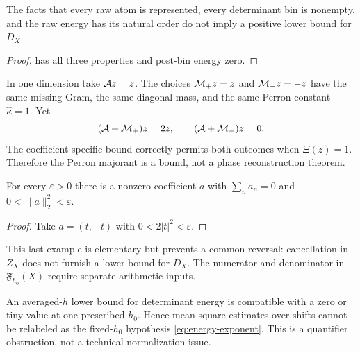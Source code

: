 \begin{corollary}
\label{cor:support-not-energy}
The facts that every raw atom is represented, every determinant bin
is nonempty, and the raw energy has its natural order do not imply a
positive lower bound for \(D_X\).
\end{corollary}

\begin{proof}
 has all three properties and
post-bin energy zero.
\end{proof}

\begin{example}
\label{ex:same-majorant}
In one dimension take \(\mathcal A z=z\).  The choices
\(\mathcal M_+z=z\) and \(\mathcal M_-z=-z\) have the same missing Gram,
the same diagonal mass, and the same Perron constant
\(\widehat\kappa=1\).  Yet
\[
 (\mathcal A+\mathcal M_+)z=2z,
 \qquad
 (\mathcal A+\mathcal M_-)z=0.
\]
The coefficient-specific bound correctly permits both outcomes when
\(\Xi(z)=1\).  Therefore the Perron majorant is a bound, not a phase
reconstruction theorem.
\end{example}

\begin{proposition}
\label{prop:zero-not-energy}
For every \(\varepsilon>0\) there is a nonzero coefficient \(a\) with
\(\sum_na_n=0\) and \(0<\|a\|_2^2<\varepsilon\).
\end{proposition}

\begin{proof}
Take \(a=(t,-t)\) with
\(0<2|t|^2<\varepsilon\).
\end{proof}

This last example is elementary but prevents a common reversal:
cancellation in \(Z_X\) does not furnish a lower bound for \(D_X\).
The numerator and denominator in \(\mathfrak F_{h_0}(X)\) require
separate arithmetic inputs.

\begin{remark}
An averaged-\(h\) lower bound for determinant energy is compatible
with a zero or tiny value at one prescribed \(h_0\).  Hence
mean-square estimates over shifts cannot be relabeled as the
fixed-\(h_0\) hypothesis \eqref{eq:energy-exponent}.  This is a
quantifier obstruction, not a technical normalization issue.
\end{remark}
